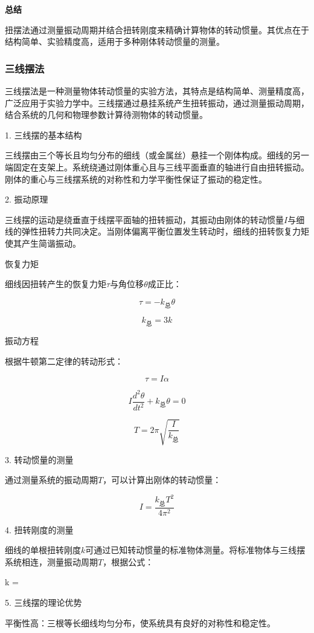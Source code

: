 \documentclass[12pt,hyperref,a4paper,UTF8]{ctexart}
\begin{document}
\textbf{总结}

扭摆法通过测量振动周期并结合扭转刚度来精确计算物体的转动惯量。其优点在于结构简单、实验精度高，适用于多种刚体转动惯量的测量。

\subsubsection{三线摆法}

三线摆法是一种测量物体转动惯量的实验方法，其特点是结构简单、测量精度高，广泛应用于实验力学中。三线摆通过悬挂系统产生扭转振动，通过测量振动周期，结合系统的几何和物理参数计算待测物体的转动惯量。

1. 三线摆的基本结构

三线摆由三个等长且均匀分布的细线（或金属丝）悬挂一个刚体构成。细线的另一端固定在支架上。系统绕通过刚体重心且与三线平面垂直的轴进行自由扭转振动。刚体的重心与三线摆系统的对称性和力学平衡性保证了振动的稳定性。

2. 振动原理

三线摆的运动是绕垂直于线摆平面轴的扭转振动，其振动由刚体的转动惯量$I$与细线的弹性扭转力共同决定。当刚体偏离平衡位置发生转动时，细线的扭转恢复力矩使其产生简谐振动。

恢复力矩

细线因扭转产生的恢复力矩$\tau$与角位移$\theta$成正比：

$$ \tau = -k_{\text{总}} \theta $$

$$ k_{\text{总}} = 3k $$

振动方程

根据牛顿第二定律的转动形式：

$$ \tau = I \alpha $$

$$ I \frac{d^2\theta}{dt^2} + k_{\text{总}} \theta = 0 $$

$$ T = 2\pi \sqrt{\frac{I}{k_{\text{总}}}} $$

3. 转动惯量的测量

通过测量系统的振动周期$T$，可以计算出刚体的转动惯量：

$$ I = \frac{k_{\text{总}} T^2}{4\pi^2} $$

4. 扭转刚度的测量

细线的单根扭转刚度$k$可通过已知转动惯量的标准物体测量。将标准物体与三线摆系统相连，测量振动周期$T$，根据公式：

k = 

5. 三线摆的理论优势

平衡性高：三根等长细线均匀分布，使系统具有良好的对称性和稳定性。
\end{document}
